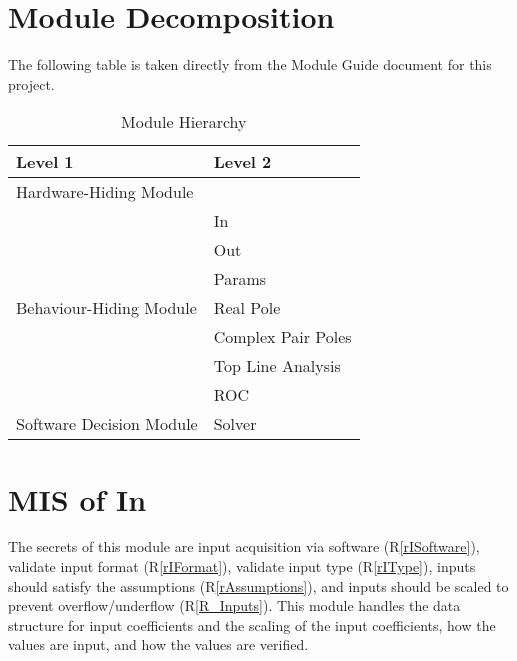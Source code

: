 \documentclass[12pt, titlepage]{article}
\newcommand{\rref}[1]{(R\ref{#1})}
\begin{document}
\section{Module Decomposition}

The following table is taken directly from the Module Guide document for this project.

\begin{table}[!ht]
\centering
\begin{tabular}{p{} p{}}
\toprule
\textbf{Level 1} & \textbf{Level 2}\\
\midrule

\multirow{1}{0.3\textwidth}{Hardware-Hiding Module} & \\

\midrule

\multirow{7}{0.3\textwidth}{Behaviour-Hiding Module}
  & In\\
  & Out\\
  & Params\\
  & Real Pole\\
  & Complex Pair Poles\\ 
  & Top Line Analysis\\
  & ROC\\
\midrule

{Software Decision Module} & Solver\\
\bottomrule

\end{tabular}
\caption{Module Hierarchy}
\label{tb:module}
\end{table}



\newpage

\section{MIS of In} \label{sc:MIS_IN}

The secrets of this module are
 input acquisition via software \rref{rISoftware},
 validate input format \rref{rIFormat},
 validate input type \rref{rIType},
 inputs should satisfy the assumptions \rref{rAssumptions}, and
 inputs should be scaled to prevent overflow/underflow \rref{R_Inputs}.
This module handles the data structure for input coefficients and the scaling of
 the input coefficients, how the values are input,
 and how the values are verified.
\end{document}
